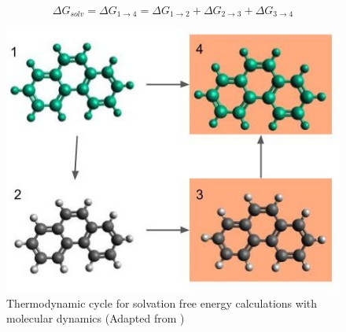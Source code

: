 \begin{equation}
\label{eq:freesolv}
\begin{aligned}
\Delta G_{solv} = \Delta G_{1 \rightarrow 4} = \Delta G_{1 \rightarrow 2} + \Delta G_{2 \rightarrow 3} + \Delta G_{3 \rightarrow 4}  
\end{aligned}
\end{equation}

\begin{figure}[th]
	\centering
	\includegraphics[scale=0.6]{Figures/cicclotermo.jpg}
	\caption{Thermodynamic cycle for solvation free energy calculations with molecular dynamics (Adapted from )}
	\label{thermcy}
\end{figure}

